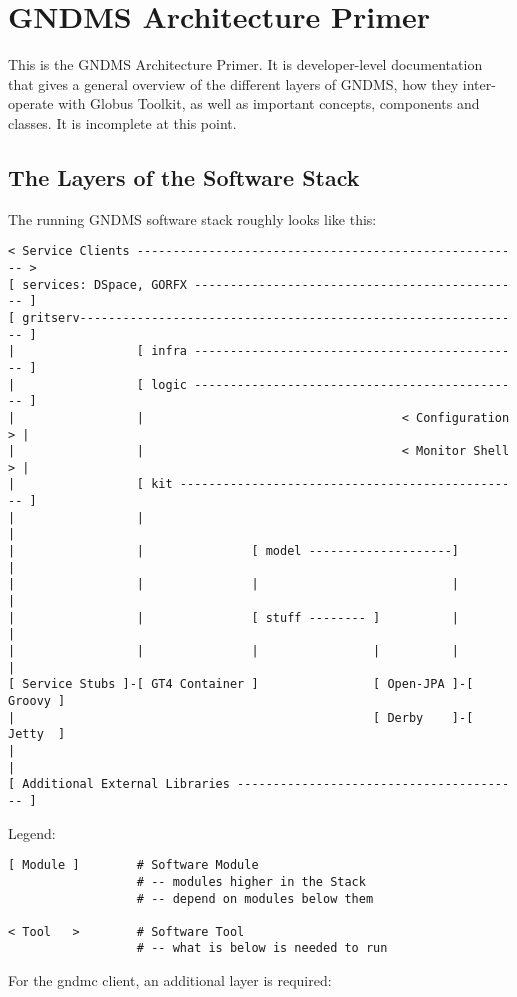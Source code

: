 \documentclass{article}
\begin{document}
\section{GNDMS Architecture Primer}

This is the GNDMS Architecture Primer. It is developer-level
documentation that gives a general overview of the different layers
of GNDMS, how they inter-operate with Globus Toolkit, as well as
important concepts, components and classes. It is incomplete at
this point.

\subsection{The Layers of the Software Stack}

The running GNDMS software stack roughly looks like this:

\begin{verbatim}
< Service Clients ------------------------------------------------------ >
[ services: DSpace, GORFX ---------------------------------------------- ]    
[ gritserv-------------------------------------------------------------- ]
|                 [ infra ---------------------------------------------- ]
|                 [ logic ---------------------------------------------- ]
|                 |                                    < Configuration > |
|                 |                                    < Monitor Shell > |
|                 [ kit ------------------------------------------------ ]
|                 |                                                      |    
|                 |               [ model --------------------]          |
|                 |               |                           |          |    
|                 |               [ stuff -------- ]          |          |      
|                 |               |                |          |          |
[ Service Stubs ]-[ GT4 Container ]                [ Open-JPA ]-[ Groovy ]
|                                                  [ Derby    ]-[ Jetty  ]
|                                                                        |    
[ Additional External Libraries ---------------------------------------- ]
\end{verbatim}
Legend:

\begin{verbatim}
[ Module ]        # Software Module
                  # -- modules higher in the Stack
                  # -- depend on modules below them

< Tool   >        # Software Tool
                  # -- what is below is needed to run
\end{verbatim}
For the gndmc client, an additional layer is required:
\end{document}
